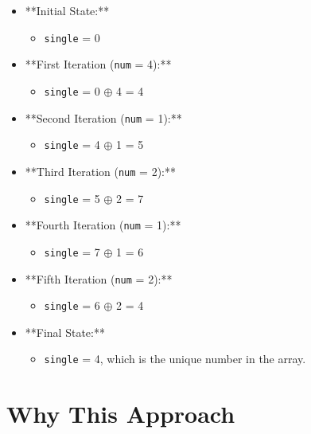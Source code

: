 \begin{itemize}
    \item **Initial State:**
    \begin{itemize}
        \item \texttt{single} = 0
    \end{itemize}
    
    \item **First Iteration (\texttt{num} = 4):**
    \begin{itemize}
        \item \texttt{single} = 0 \(\oplus\) 4 = 4
    \end{itemize}
    
    \item **Second Iteration (\texttt{num} = 1):**
    \begin{itemize}
        \item \texttt{single} = 4 \(\oplus\) 1 = 5
    \end{itemize}
    
    \item **Third Iteration (\texttt{num} = 2):**
    \begin{itemize}
        \item \texttt{single} = 5 \(\oplus\) 2 = 7
    \end{itemize}
    
    \item **Fourth Iteration (\texttt{num} = 1):**
    \begin{itemize}
        \item \texttt{single} = 7 \(\oplus\) 1 = 6
    \end{itemize}
    
    \item **Fifth Iteration (\texttt{num} = 2):**
    \begin{itemize}
        \item \texttt{single} = 6 \(\oplus\) 2 = 4
    \end{itemize}
    
    \item **Final State:**
    \begin{itemize}
        \item \texttt{single} = 4, which is the unique number in the array.
    \end{itemize}
\end{itemize}

\section*{Why This Approach}

